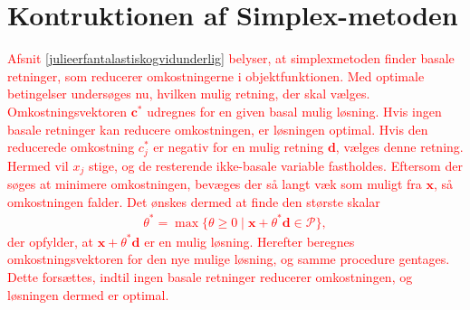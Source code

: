\section{Kontruktionen af Simplex-metoden}
%
\textcolor{red}{
Afsnit \ref{julieerfantalastiskogvidunderlig} belyser, at simplexmetoden finder basale retninger, som reducerer omkostningerne i objektfunktionen. 
Med optimale betingelser undersøges nu, hvilken mulig retning, der skal vælges. 
Omkostningsvektoren $\mathbf{c}^*$ udregnes for en given basal mulig løsning. 
Hvis ingen basale retninger kan reducere omkostningen, er løsningen optimal. 
Hvis den reducerede omkostning $c^*_j$ er negativ for en mulig retning $\mathbf{d}$, vælges denne retning. 
Hermed vil $x_j$ stige, og de resterende ikke-basale variable fastholdes.
Eftersom der søges at minimere omkostningen, bevæges der så langt væk som muligt fra $\mathbf{x}$, så omkostningen falder.
Det ønskes dermed at finde den største skalar
\begin{align*}
\theta^* = \max \{ \theta \geq 0 \mid \textbf{x} + \theta^*\textbf{d} \in \mathcal{P} \},
\end{align*}
%
der opfylder, at $\mathbf{x} + \theta^* \mathbf{d}$ er en mulig løsning.
Herefter beregnes omkostningsvektoren for den nye mulige løsning, og samme procedure gentages. Dette forsættes, indtil ingen basale retninger reducerer omkostningen, og løsningen dermed er optimal.
%
}
%
%
%	
%	
%	
%	
%